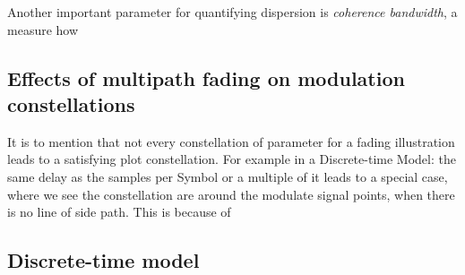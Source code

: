 Another important parameter for quantifying dispersion is \emph{coherence bandwidth}, a measure how 


\subsection{Effects of multipath fading on modulation constellations}


It is to mention that not every constellation of parameter for a fading illustration leads to a satisfying  plot constellation.
For example in a Discrete-time Model: the same delay as the samples per Symbol or a multiple of it leads to a special case, where we see the constellation are around the modulate signal points, when there is no line of side path. This is because of 

\subsection{Discrete-time model} \label{sec:discrete-time-model}


